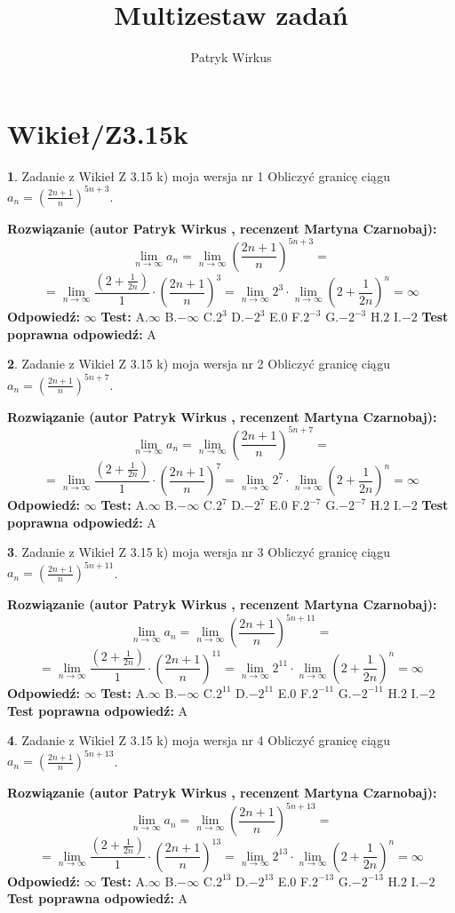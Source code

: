 \documentclass[12pt, a4paper]{article}
\title{Multizestaw zadań}
\author{Patryk Wirkus}
\date{}
\theoremstyle{definition} %
\newtheorem{zad}{}
\newcommand{\kategoria}[1]{\section{#1}}
\newcommand{\zadStart}[1]{\begin{zad}#1\newline}
\newcommand{\zadStop}{\end{zad}}
\newcommand{\rozwStart}[2]{\noindent \textbf{Rozwiązanie (autor #1 , recenzent #2): }\newline}
\newcommand{\rozwStop}{\newline}
\newcommand{\odpStart}{\noindent \textbf{Odpowiedź:}\newline}
\newcommand{\odpStop}{\newline}
\newcommand{\testStart}{\noindent \textbf{Test:}\newline}
\newcommand{\testStop}{\newline}
\newcommand{\kluczStart}{\noindent \textbf{Test poprawna odpowiedź:}\newline}
\newcommand{\kluczStop}{\newline}
\begin{document}
\maketitle

\kategoria{Wikieł/Z3.15k}


\zadStart{Zadanie z Wikieł Z 3.15 k) moja wersja nr 1}
Obliczyć granicę ciągu $a_{n}=(\frac{2n+1}{n})^{5n+3}$.
\zadStop
\rozwStart{Patryk Wirkus}{Martyna Czarnobaj}
$$\lim\limits_{n\to\infty} a_{n} = \lim\limits_{n\to\infty}(\frac{2n+1}{n})^{5n+3}=$$
$$=\lim\limits_{n\to\infty}\frac{(2+\frac{1}{2n})}{1} \cdot (\frac{2n+1}{n})^{3} = \lim\limits_{n\to\infty} 2^{3} \cdot \lim\limits_{n\to\infty} (2+\frac{1}{2n})^{n} = \infty$$
\rozwStop
\odpStart
$\infty$
\odpStop
\testStart
A.$\infty$
B.$-\infty$
C.$2^{3}$
D.$-2^{3}$
E.$0$
F.$2^{-3}$
G.$-2^{-3}$
H.$2$
I.$-2$
\testStop
\kluczStart
A
\kluczStop



\zadStart{Zadanie z Wikieł Z 3.15 k) moja wersja nr 2}
Obliczyć granicę ciągu $a_{n}=(\frac{2n+1}{n})^{5n+7}$.
\zadStop
\rozwStart{Patryk Wirkus}{Martyna Czarnobaj}
$$\lim\limits_{n\to\infty} a_{n} = \lim\limits_{n\to\infty}(\frac{2n+1}{n})^{5n+7}=$$
$$=\lim\limits_{n\to\infty}\frac{(2+\frac{1}{2n})}{1} \cdot (\frac{2n+1}{n})^{7} = \lim\limits_{n\to\infty} 2^{7} \cdot \lim\limits_{n\to\infty} (2+\frac{1}{2n})^{n} = \infty$$
\rozwStop
\odpStart
$\infty$
\odpStop
\testStart
A.$\infty$
B.$-\infty$
C.$2^{7}$
D.$-2^{7}$
E.$0$
F.$2^{-7}$
G.$-2^{-7}$
H.$2$
I.$-2$
\testStop
\kluczStart
A
\kluczStop



\zadStart{Zadanie z Wikieł Z 3.15 k) moja wersja nr 3}
Obliczyć granicę ciągu $a_{n}=(\frac{2n+1}{n})^{5n+11}$.
\zadStop
\rozwStart{Patryk Wirkus}{Martyna Czarnobaj}
$$\lim\limits_{n\to\infty} a_{n} = \lim\limits_{n\to\infty}(\frac{2n+1}{n})^{5n+11}=$$
$$=\lim\limits_{n\to\infty}\frac{(2+\frac{1}{2n})}{1} \cdot (\frac{2n+1}{n})^{11} = \lim\limits_{n\to\infty} 2^{11} \cdot \lim\limits_{n\to\infty} (2+\frac{1}{2n})^{n} = \infty$$
\rozwStop
\odpStart
$\infty$
\odpStop
\testStart
A.$\infty$
B.$-\infty$
C.$2^{11}$
D.$-2^{11}$
E.$0$
F.$2^{-11}$
G.$-2^{-11}$
H.$2$
I.$-2$
\testStop
\kluczStart
A
\kluczStop



\zadStart{Zadanie z Wikieł Z 3.15 k) moja wersja nr 4}
Obliczyć granicę ciągu $a_{n}=(\frac{2n+1}{n})^{5n+13}$.
\zadStop
\rozwStart{Patryk Wirkus}{Martyna Czarnobaj}
$$\lim\limits_{n\to\infty} a_{n} = \lim\limits_{n\to\infty}(\frac{2n+1}{n})^{5n+13}=$$
$$=\lim\limits_{n\to\infty}\frac{(2+\frac{1}{2n})}{1} \cdot (\frac{2n+1}{n})^{13} = \lim\limits_{n\to\infty} 2^{13} \cdot \lim\limits_{n\to\infty} (2+\frac{1}{2n})^{n} = \infty$$
\rozwStop
\odpStart
$\infty$
\odpStop
\testStart
A.$\infty$
B.$-\infty$
C.$2^{13}$
D.$-2^{13}$
E.$0$
F.$2^{-13}$
G.$-2^{-13}$
H.$2$
I.$-2$
\testStop
\kluczStart
A
\kluczStop
\end{document}
